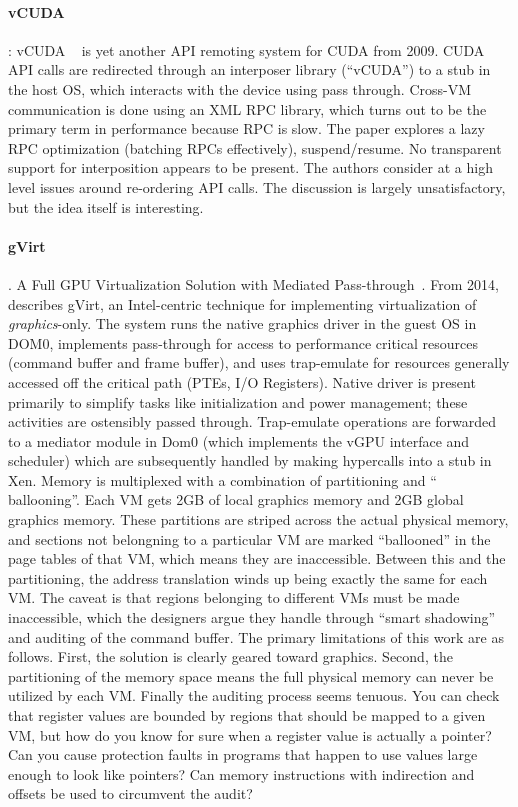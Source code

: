 \paragraph {\bf vCUDA}: vCUDA ~\cite{vCUDA} is yet another API remoting system for CUDA from 2009. CUDA API calls are redirected
	through an interposer library (``vCUDA'') to a stub in the host OS, which interacts with the device using pass through.
	Cross-VM communication is done using an XML RPC library, which turns out to be the primary term in performance because
	RPC is slow. The paper explores a lazy RPC optimization (batching RPCs effectively), suspend/resume. No transparent support
	for interposition appears to be present. The authors consider at a high level issues around re-ordering API calls.
	The discussion is largely unsatisfactory, but the idea itself is interesting.


\paragraph {\bf gVirt}. A Full GPU Virtualization Solution with Mediated Pass-through~\cite{Tian:2014:FGV:2643634.2643647}. From 2014, describes
     gVirt, an Intel-centric technique for implementing virtualization of \emph{graphics}-only. The system runs the native graphics driver
	 in the guest OS in DOM0, implements pass-through for access to performance critical resources (command buffer and frame buffer),
	 and uses trap-emulate for resources generally accessed off the critical path (PTEs, I/O Registers). Native driver is present
	 primarily to simplify tasks like initialization and power management; these activities are ostensibly passed through. Trap-emulate
	 operations are forwarded to a mediator module in Dom0 (which implements the vGPU interface and scheduler) which are subsequently
	 handled by making hypercalls into a stub in Xen. Memory is multiplexed with a combination of partitioning and `` ballooning''.
	 Each VM gets 2GB of local graphics memory and 2GB global graphics memory. These partitions are striped across the actual physical
	 memory, and sections not belongning to a particular VM are marked ``ballooned'' in the page tables of that VM, which means they
	 are inaccessible. Between this and the partitioning, the address translation winds up being exactly the same for each VM. The
	 caveat is that regions belonging to different VMs must be made inaccessible, which the designers argue they handle through
	 ``smart shadowing'' and auditing of the command buffer. The primary limitations of this work are as follows. First, the
	 solution is clearly geared toward graphics. Second, the partitioning of the memory space means the full physical memory
	 can never be utilized by each VM. Finally the auditing process seems tenuous. You can check that register values are
	 bounded by regions that should be mapped to a given VM, but how do you know for sure when a register value is actually
	 a pointer? Can you cause protection faults in programs that happen to use values large enough to look like pointers?
	 Can memory instructions with indirection and offsets be used to circumvent the audit?

